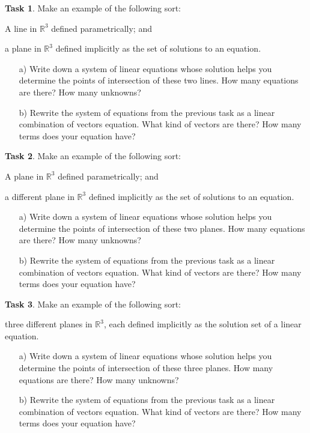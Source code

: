 \documentclass{tufte-book}
\theoremstyle{definition}
\newtheorem{task}{Task}
\begin{document}
\begin{task}
Make an example of the following sort:
\begin{compactitem}
\item A line in $\mathbb{R}^3$ defined parametrically; and
\item a plane in $\mathbb{R}^3$ defined implicitly as the set of solutions to an equation.
\end{compactitem}
\begin{enumerate}
\item[a)] Write down a system of linear equations whose solution helps you determine the points of intersection of these two lines. How many equations are there? How many unknowns?

\item[b)] Rewrite the system of equations from the previous task as a linear combination of vectors equation. What kind of vectors are there? How many terms does your equation have?
\end{enumerate}
\end{task}

\begin{task}
Make an example of the following sort:
\begin{compactitem}
\item A plane in $\mathbb{R}^3$ defined parametrically; and
\item a different plane in $\mathbb{R}^3$ defined implicitly as the set of solutions to an equation.
\end{compactitem}
\begin{enumerate}
\item[a)] Write down a system of linear equations whose solution helps you determine the points of intersection of these two planes. How many equations are there? How many unknowns?

\item[b)] Rewrite the system of equations from the previous task as a linear combination of vectors equation. What kind of vectors are there? How many terms does your equation have?
\end{enumerate}
\end{task}


\begin{task}
Make an example of the following sort:
\begin{compactitem}
\item three different planes in $\mathbb{R}^3$, each defined implicitly as the solution set of a linear equation.
\end{compactitem}
\begin{enumerate}
\item[a)] Write down a system of linear equations whose solution helps you determine the points of intersection of these three planes. How many equations are there? How many unknowns?

\item[b)] Rewrite the system of equations from the previous task as a linear combination of vectors equation. What kind of vectors are there? How many terms does your equation have?
\end{enumerate}
\end{task}
\end{document}

